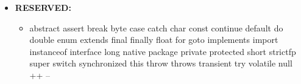 \documentclass[12pt]{article}
\begin{document}
	         \begin{itemize} 
	        \item \textbf{RESERVED:}
	       	            \begin{itemize}
	       	                \item abstract
	       	                \text{\textbar} assert 
	       	                \text{\textbar} break 
	       	                \text{\textbar} byte 
	       	                \text{\textbar} case 
	       	                \text{\textbar} catch 
	       	                \text{\textbar} char 
	       	                \text{\textbar} const 
	       	                \text{\textbar} continue
	       	                 \text{\textbar} default 
	       	                 \text{\textbar} do 
	       	                 \text{\textbar} double
	       	                 \text{\textbar} enum 
	       	                 \text{\textbar} extends 
	       	                 \text{\textbar} final 
	       	                 \text{\textbar} finally 
	       	                 \text{\textbar} float 
	       	                 \text{\textbar} for 
	       	                 \text{\textbar} goto 
	       	                 \text{\textbar} implements 
	       	                 \text{\textbar} import 
	       	                 \text{\textbar} instanceof
	       	                 \text{\textbar} interface 
	       	                 \text{\textbar} long
	       	                 \text{\textbar} native
	       	                 \text{\textbar} package
	       	                 \text{\textbar} private 
	       	                 \text{\textbar} protected 
	       	                 \text{\textbar} short 
	       	                 \text{\textbar} strictfp
	       	                 \text{\textbar} super 
	       	                 \text{\textbar} switch 
	       	                 \text{\textbar} synchronized 
	       	                 \text{\textbar} this 
	       	                 \text{\textbar} throw 
	       	                 \text{\textbar} throws 
	       	                 \text{\textbar} transient 
	       	                 \text{\textbar} try
	       	                 \text{\textbar} volatile
		       	             \text{\textbar} null
	       	                 \text{\textbar} ++
	       	                 \text{\textbar} --
	       	            \end{itemize}      	        
		\end{itemize}
		
		
\end{document}
